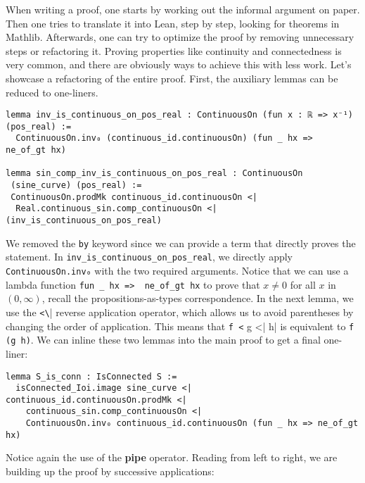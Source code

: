 When writing a proof, one starts by working out the informal argument on paper.
Then one tries to translate it into Lean, step by step, looking for theorems in Mathlib.
Afterwards, one can try to optimize the proof by removing unnecessary steps or refactoring it.
Proving properties like continuity and connectedness is very common,
and there are obviously ways to achieve this with less work.
Let's showcase a refactoring of the entire proof.
First, the auxiliary lemmas
can be reduced to one-liners.
\newpage
\begin{lstlisting}[language=lean]
lemma inv_is_continuous_on_pos_real : ContinuousOn (fun x : ℝ => x⁻¹) (pos_real) :=
  ContinuousOn.inv₀ (continuous_id.continuousOn) (fun _ hx =>  ne_of_gt hx)
  
lemma sin_comp_inv_is_continuous_on_pos_real : ContinuousOn
 (sine_curve) (pos_real) :=
 ContinuousOn.prodMk continuous_id.continuousOn <|
  Real.continuous_sin.comp_continuousOn <| (inv_is_continuous_on_pos_real)
\end{lstlisting}
We removed the \lstinline[language=lean]|by| keyword since we can provide a term
that directly proves the statement.
In \lstinline[language=lean]|inv_is_continuous_on_pos_real|, we directly apply
\lstinline[language=lean]|ContinuousOn.inv₀| with the two required arguments.
Notice that we can use a lambda function \lstinline[language=lean]|fun _ hx =>  ne_of_gt hx|
to prove that $x \neq 0$ for all $x$ in $(0, \infty)$, recall the propositions-as-types correspondence.
In the next lemma, we use
the \lstinline[language=lean]|<\|| reverse application operator,
which allows us to avoid parentheses by changing the order of application.
This means that \lstinline[language=lean]|f <| g <| h| is
equivalent to \lstinline[language=lean]|f (g h)|.
We can inline these two lemmas into the main proof to get a final one-liner:
\begin{lstlisting}[language=lean]
lemma S_is_conn : IsConnected S :=
  isConnected_Ioi.image sine_curve <| continuous_id.continuousOn.prodMk <|
    continuous_sin.comp_continuousOn <|
    ContinuousOn.inv₀ continuous_id.continuousOn (fun _ hx => ne_of_gt hx)
\end{lstlisting}
Notice again the use of the \textbf{pipe} operator.
Reading from left to right, we are building up the proof by successive applications:

